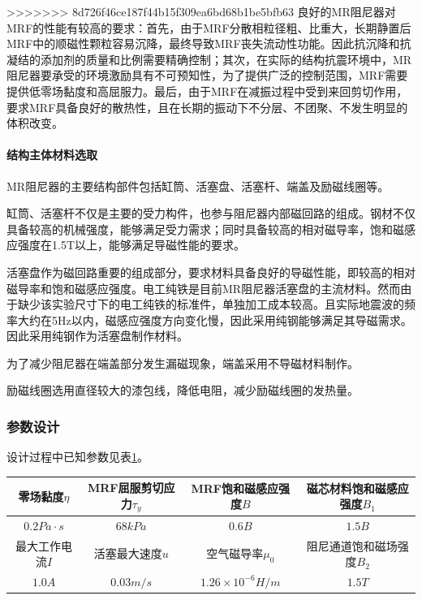 >>>>>>> 8d726f46ce187f44b15f309ea6bd68b1be5bfb63
良好的MR阻尼器对MRF的性能有较高的要求：首先，由于MRF分散相粒径粗、比重大，长期静置后MRF中的顺磁性颗粒容易沉降，最终导致MRF丧失流动性功能。因此抗沉降和抗凝结的添加剂的质量和比例需要精确控制；其次，在实际的结构抗震环境中，MR阻尼器要承受的环境激励具有不可预知性，为了提供广泛的控制范围，MRF需要提供低零场黏度和高屈服力。最后，由于MRF在减振过程中受到来回剪切作用，要求MRF具备良好的散热性，且在长期的振动下不分层、不团聚、不发生明显的体积改变。

\paragraph{结构主体材料选取}

\qquad MR阻尼器的主要结构部件包括缸筒、活塞盘、活塞杆、端盖及励磁线圈等。

缸筒、活塞杆不仅是主要的受力构件，也参与阻尼器内部磁回路的组成。钢材不仅具备较高的机械强度，能够满足受力需求；同时具备较高的相对磁导率，饱和磁感应强度在1.5T以上，能够满足导磁性能的要求。

活塞盘作为磁回路重要的组成部分，要求材料具备良好的导磁性能，即较高的相对磁导率和饱和磁感应强度。电工纯铁是目前MR阻尼器活塞盘的主流材料。然而由于缺少该实验尺寸下的电工纯铁的标准件，单独加工成本较高。且实际地震波的频率大约在5Hz以内，磁感应强度方向变化慢，因此采用纯钢能够满足其导磁需求。因此采用纯钢作为活塞盘制作材料。

为了减少阻尼器在端盖部分发生漏磁现象，端盖采用不导磁材料制作。

励磁线圈选用直径较大的漆包线，降低电阻，减少励磁线圈的发热量。

\subsubsection{参数设计}

设计过程中已知参数见表\ref{init}。
\begin{table}[H]
\centering
\label{init}
\footnotesize
\begin{tabular}{|c|c|c|c|}
\hline 零场黏度$\eta$ & MRF屈服剪切应力$\tau_y$ & MRF饱和磁感应强度$B$ & 磁芯材料饱和磁感应强度$B_1$ \\
\hline $0.2Pa\cdot s$ & $68kPa$ & $0.6B$ & $1.5B$ \\
\hline 最大工作电流$I$ & 活塞最大速度$u$ & 空气磁导率$\mu_0$ & 阻尼通道饱和磁场强度$B_2$ \\
\hline $1.0A$ & $0.03m/s$ & $1.26\times10^{-6}H/m$ & $1.5T$ \\
\hline
\end{tabular}
\end{table}



